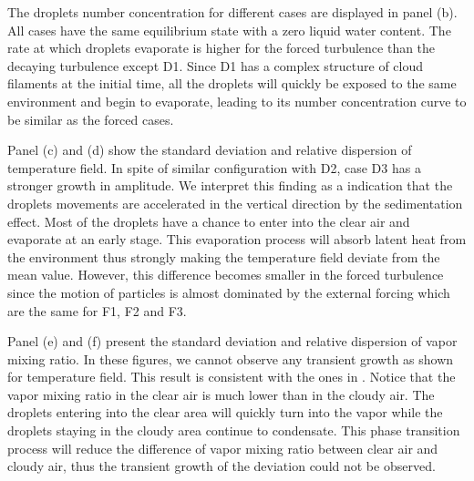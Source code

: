 \documentclass[draft,jgrga]{AGUTeX}
\begin{document}
\begin{article}
The droplets number concentration for different cases are displayed in panel (b). All cases have the same equilibrium state with a zero liquid water content. The rate at which droplets evaporate is higher for the forced turbulence than the decaying turbulence except D1. Since D1 has a complex structure of cloud filaments at the initial time, all the droplets will quickly be exposed to the same environment and begin to evaporate, leading to its number concentration curve to be similar as the forced cases.

Panel (c) and (d) show the standard deviation and relative dispersion of temperature field. In spite of similar configuration with D2, case D3 has a stronger growth in amplitude. We interpret this finding as a indication that the droplets movements are accelerated in the vertical direction by the sedimentation effect. Most of the droplets have a chance to enter into the clear air and evaporate at an early stage. This evaporation process will absorb latent heat from the environment thus strongly making the temperature field deviate from the mean value. However, this difference becomes smaller in the forced turbulence since the motion of particles is almost dominated by the external forcing which are the same for F1, F2 and F3.

Panel (e) and (f) present the standard deviation and relative dispersion of vapor mixing ratio. In these figures, we cannot observe any transient growth as shown for temperature field. This result is consistent with the ones in \cite{Kumar14}. Notice that the vapor mixing ratio in the clear air is much lower than in the cloudy air. The droplets entering into the clear area will quickly turn into the vapor while the droplets staying in the cloudy area continue to condensate. This phase transition process will reduce the difference of vapor mixing ratio between clear air and cloudy air, thus the transient growth of the deviation could not be observed.


\end{article}
\end{document}
